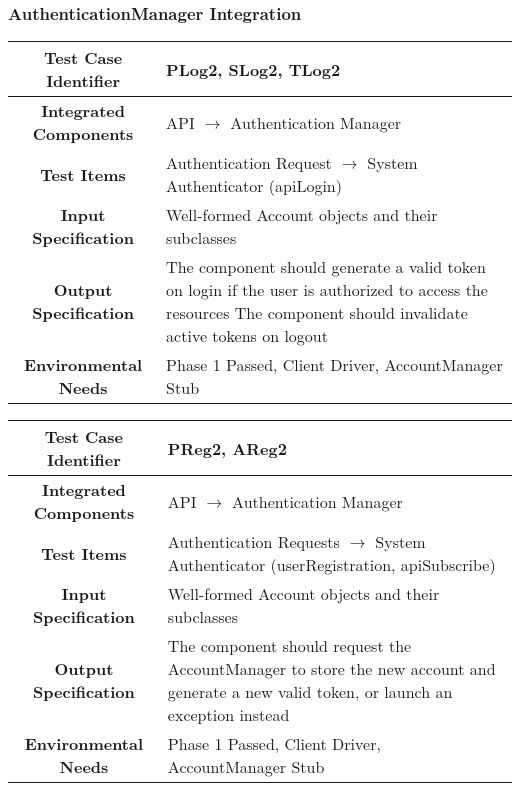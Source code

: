 \documentclass[11pt, a4paper,titlepage]{article}
\begin{document}
	 \subsubsection{AuthenticationManager Integration}
	 \begin{tabularx}{\textwidth}{| c|X|}
	 	\hline \textbf{Test Case Identifier} & PLog2, SLog2, TLog2 \\
	 	\hline \textbf{Integrated Components} &  API $\rightarrow $ Authentication Manager\\
	 	\hline \textbf{Test Items} &  Authentication Request $\rightarrow $ System Authenticator (apiLogin)\\
	 	\hline \textbf{Input Specification} &  Well-formed Account objects and their subclasses\\
	 	\hline \textbf{Output Specification} & The component should generate a valid token on login if the user is authorized to access the resources \newline
	 	The component should invalidate active tokens on logout \\
	 	\hline \textbf{Environmental Needs} &  Phase 1 Passed, Client Driver, AccountManager Stub \\
	 	\hline
	 \end{tabularx}
	 \newline
	 
	 \begin{tabularx}{\textwidth}{| c|X|}
	 	\hline \textbf{Test Case Identifier} &  PReg2, AReg2 \\
	 	\hline \textbf{Integrated Components} & API $\rightarrow $ Authentication Manager \\
	 	\hline \textbf{Test Items} &  Authentication Requests $\rightarrow $ System Authenticator (userRegistration, apiSubscribe)\\
	 	\hline \textbf{Input Specification} & Well-formed Account objects and their subclasses  \\
	 	\hline \textbf{Output Specification} & The component should request the AccountManager to store the new account and generate a new valid token, or launch an exception instead \\
	 	\hline \textbf{Environmental Needs} & Phase 1 Passed, Client Driver, AccountManager Stub \\
	 	\hline
	 \end{tabularx}
	 \newline
	 
	 
\end{document}
